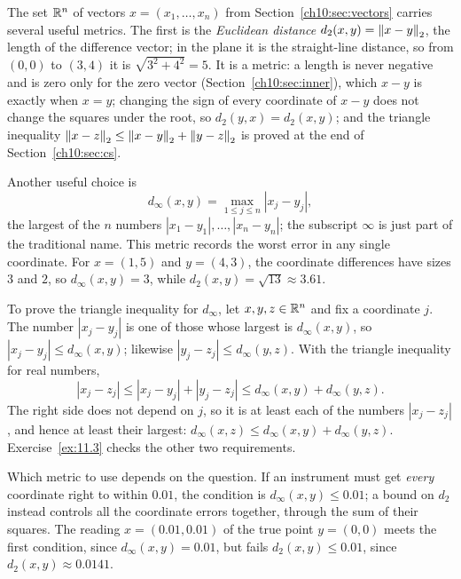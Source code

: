 The set $\mathbb R^n$ of vectors $x=(x_1,\ldots,x_n)$ from Section~\ref{ch10:sec:vectors} carries several useful metrics. The first is the \emph{Euclidean distance} $d_2(x,y)=\left\|x-y\right\|_2$, the length of the difference vector; in the plane it is the straight-line distance, so from $(0,0)$ to $(3,4)$ it is $\sqrt{3^2+4^2}=5$. It is a metric: a length is never negative and is zero only for the zero vector (Section~\ref{ch10:sec:inner}), which $x-y$ is exactly when $x=y$; changing the sign of every coordinate of $x-y$ does not change the squares under the root, so $d_2(y,x)=d_2(x,y)$; and the triangle inequality $\left\|x-z\right\|_2\le\left\|x-y\right\|_2+\left\|y-z\right\|_2$ is proved at the end of Section~\ref{ch10:sec:cs}.

Another useful choice is
\[
d_\infty(x,y)=\max_{1\le j\le n}|x_j-y_j|,
\]
the largest of the $n$ numbers $|x_1-y_1|,\ldots,|x_n-y_n|$; the subscript $\infty$ is just part of the traditional name. This metric records the worst error in any single coordinate. For $x=(1,5)$ and $y=(4,3)$, the coordinate differences have sizes $3$ and $2$, so $d_\infty(x,y)=3$, while $d_2(x,y)=\sqrt{13}\approx3.61$.

To prove the triangle inequality for $d_\infty$, let $x,y,z\in\mathbb R^n$ and fix a coordinate $j$. The number $|x_j-y_j|$ is one of those whose largest is $d_\infty(x,y)$, so $|x_j-y_j|\le d_\infty(x,y)$; likewise $|y_j-z_j|\le d_\infty(y,z)$. With the triangle inequality for real numbers,
\[
|x_j-z_j|\le|x_j-y_j|+|y_j-z_j|\le d_\infty(x,y)+d_\infty(y,z).
\]
The right side does not depend on $j$, so it is at least each of the numbers $|x_j-z_j|$, and hence at least their largest: $d_\infty(x,z)\le d_\infty(x,y)+d_\infty(y,z)$. Exercise~\ref{ex:11.3} checks the other two requirements.

Which metric to use depends on the question. If an instrument must get \emph{every} coordinate right to within $0.01$, the condition is $d_\infty(x,y)\le0.01$; a bound on $d_2$ instead controls all the coordinate errors together, through the sum of their squares. The reading $x=(0.01,0.01)$ of the true point $y=(0,0)$ meets the first condition, since $d_\infty(x,y)=0.01$, but fails $d_2(x,y)\le0.01$, since $d_2(x,y)\approx0.0141$.

